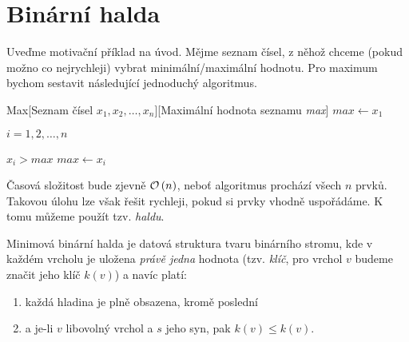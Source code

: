 \section{Binární halda}\label{sec:halda}

Uveďme motivační příklad na úvod. Mějme seznam čísel, z něhož chceme (pokud možno co nejrychleji) vybrat minimální/maximální hodnotu. Pro maximum bychom sestavit následující jednoduchý algoritmus.
\begin{pseudo}{Max}[Seznam čísel $x_1,x_2,\dots,x_n$][Maximální hodnota seznamu \textit{max}]
    $max\gets x_1$\\
    \begin{For}{$i=1,2,\dots,n$}
        \begin{If}{$x_i>max$}
            $max\gets x_i$
        \end{If}
    \end{For}
\end{pseudo}
Časová složitost bude zjevně $\mathcal{O}\left(n\right)$, neboť algoritmus prochází všech $n$ prvků. Takovou úlohu lze však řešit rychleji, pokud si prvky vhodně uspořádáme. K tomu můžeme použít tzv. \emph{haldu}. 
\begin{definition}
    Minimová binární halda je datová struktura tvaru binárního stromu, kde v každém vrcholu je uložena \emph{právě jedna} hodnota (tzv. \emph{klíč}, pro vrchol $v$ budeme značit jeho klíč $k(v)$) a navíc platí:
    \begin{enumerate}[label=(\roman*)]
        \item každá hladina je plně obsazena, kromě poslední
        \item a je-li $v$ libovolný vrchol a $s$ jeho syn, pak $k(v)\leq k(v)$.
    \end{enumerate}
\end{definition}